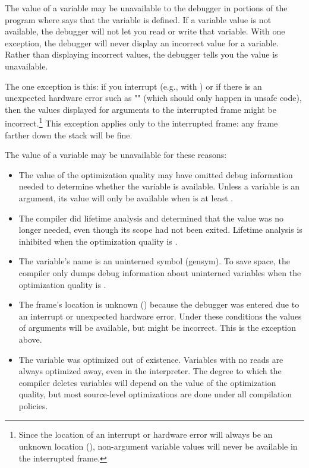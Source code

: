 The value of a variable may be unavailable to the debugger in portions of the
program where \clisp{} says that the variable is defined.  If a variable value is
not available, the debugger will not let you read or write that variable.  With
one exception, the debugger will never display an incorrect value for a
variable.  Rather than displaying incorrect values, the debugger tells you the
value is unavailable.

The one exception is this: if you interrupt (e.g., with ) or if there is
an unexpected hardware error such as "" (which should only happen
in unsafe code), then the values displayed for arguments to the interrupted
frame might be incorrect.\footnote{Since the location of an interrupt or hardware
error will always be an unknown location (),
non-argument variable values will never be available in the interrupted frame.}
This exception applies only to the interrupted frame: any frame farther down
the stack will be fine.

The value of a variable may be unavailable for these reasons:
\begin{itemize}

\item
The value of the  optimization quality may have omitted debug
information needed to determine whether the variable is available.
Unless a variable is an argument, its value will only be available when
 is at least .

\item
The compiler did lifetime analysis and determined that the value was no longer
needed, even though its scope had not been exited.  Lifetime analysis is
inhibited when the  optimization quality is .

\item
The variable's name is an uninterned symbol (gensym).  To save space, the
compiler only dumps debug information about uninterned variables when the
 optimization quality is .

\item
The frame's location is unknown () because
the debugger was entered due to an interrupt or unexpected hardware error.
Under these conditions the values of arguments will be available, but might be
incorrect.  This is the exception above.

\item
The variable was optimized out of existence.  Variables with no reads are
always optimized away, even in the interpreter.  The degree to which the
compiler deletes variables will depend on the value of the 
optimization quality, but most source-level optimizations are done under all
compilation policies.
\end{itemize}



